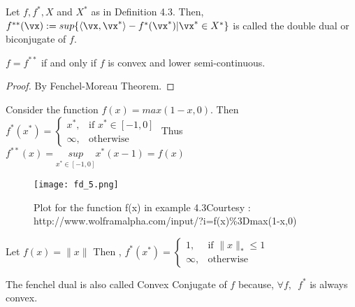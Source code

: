 \documentclass[a4paper,11pt]{article}
\begin{document}
\begin{definition}
Let \( f,f^*, X\) and  \(X^*\) as in Definition 4.3. Then, \newline
\( f^{**} (\vx) := sup\{ \langle \vx,\vx^* \rangle - f^*(\vx^*) | \vx^* \in X^* \} \) is called the double dual or biconjugate of $f$.
\cite{wiki:001}
\end{definition}

\begin{claim}
\(f=f^{**}\) if and only if $f$ is convex and lower semi-continuous.
\end{claim}

\begin{proof}
By Fenchel-Moreau Theorem.
\end{proof}

\begin{example}
Consider the function $f(x) = max(1-x,0)$. \newline
Then  \(f^*(x^*)=\begin{cases}
    x^*, & \text{if } x^* \in  [-1,0] \\
    \infty,              & \text{otherwise}
\end{cases}
\)
\newline \newline \newline
Thus \( f^{**}(x)=\underset{x^* \in [-1,0]}{sup} x^*(x-1) =f(x)\)
\end{example}

\begin{figure}[!htb]
\centering
\texttt{[image: fd\_5.png]}
\caption{Plot for the function f(x) in example 4.3\newline Courtesy : http://www.wolframalpha.com/input/?i=f(x)\%3Dmax(1-x,0)}
\end{figure}


\begin{example}
Let \( f(x) = \parallel x \parallel \) \newline \newline 
Then , \( f^*(x^*)=\begin{cases}
    1, & \text{if } \parallel x\parallel_* \leq  1 \\
    \infty,              & \text{otherwise}
\end{cases}
\)
\end{example}

\begin{remark}
The fenchel dual is also called Convex Conjugate of $f$ because, $\forall f,\,\,\,f^*$ is always convex. 
\end{remark}
\end{document}
